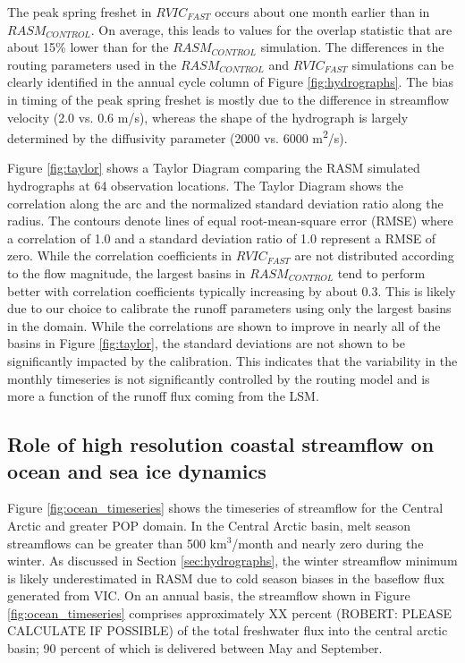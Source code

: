 \documentclass[jgrga, draft]{agutex}
\begin{document}
\begin{article}
\begin{itemize}[leftmargin=+.5in]
\begin{itemize}[leftmargin=+.5in]
The peak spring freshet in $RVIC_{FAST}$ occurs about one month earlier than in $RASM_{CONTROL}$.
On average, this leads to values for the overlap statistic that are about 15\% lower than for the $RASM_{CONTROL}$ simulation.
The differences in the routing parameters used in the $RASM_{CONTROL}$ and $RVIC_{FAST}$ simulations can be clearly identified in the annual cycle column of Figure \ref{fig:hydrographs}.
The bias in timing of the peak spring freshet is mostly due to the difference in streamflow velocity (2.0 vs. 0.6 m/s), whereas the shape of the hydrograph is largely determined by the diffusivity parameter (2000 vs. 6000 m\textsuperscript{2}/s).

Figure \ref{fig:taylor} shows a Taylor Diagram comparing the RASM simulated hydrographs at 64 observation locations.
The Taylor Diagram shows the correlation along the arc and the normalized standard deviation ratio along the radius.
The contours denote lines of equal root-mean-square error (RMSE) where a correlation of 1.0 and a standard deviation ratio of 1.0 represent a RMSE of zero.
While the correlation coefficients in $RVIC_{FAST}$ are not distributed according to the flow magnitude, the largest basins in $RASM_{CONTROL}$ tend to perform better with correlation coefficients typically increasing by about 0.3.
This is likely due to our choice to calibrate the runoff parameters using only the largest basins in the domain. %
While the correlations are shown to improve in nearly all of the basins in Figure \ref{fig:taylor}, the standard deviations are not shown to be significantly impacted by the calibration.
This indicates that the variability in the monthly timeseries is not significantly controlled by the routing model and is more a function of the runoff flux coming from the LSM.

\subsection{Role of high resolution coastal streamflow on ocean and sea ice dynamics}
\label{sec:ocean}

Figure \ref{fig:ocean_timeseries} shows the timeseries of streamflow for the Central Arctic and greater POP domain.
In the Central Arctic basin, melt season streamflows can be greater than 500 km$^3$/month and nearly zero during the winter.
As discussed in Section \ref{sec:hydrographs}, the winter streamflow minimum is likely underestimated in RASM due to cold season biases in the baseflow flux generated from VIC.
On an annual basis, the streamflow shown in Figure \ref{fig:ocean_timeseries} comprises approximately XX percent (ROBERT: PLEASE CALCULATE IF POSSIBLE) of the total freshwater flux into the central arctic basin; 90 percent of which is delivered between May and September. %


\end{itemize}
\end{itemize}
\end{article}
\end{document}
